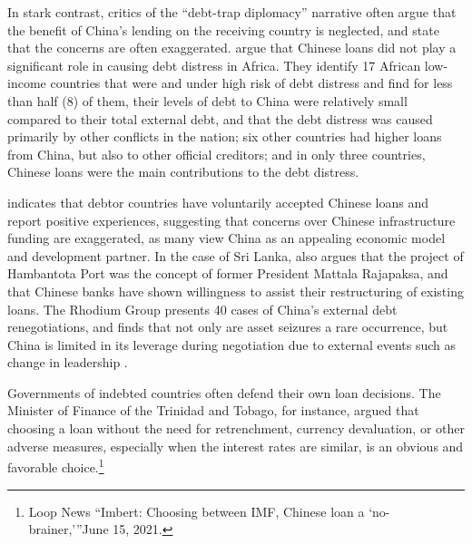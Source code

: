 In stark contrast, critics of the ``debt-trap diplomacy'' narrative often argue that the benefit of China's lending on the receiving country is neglected, and state that the concerns are often exaggerated.
\citet*{Eom-18} argue that Chinese loans did not play a significant role in causing debt distress in Africa. They identify 17 African low-income  countries that were and under high risk of debt distress and find for less than half (8) of them, their levels of debt to China were relatively small compared to their total external debt, and that the debt distress was caused primarily by other conflicts in the nation; six other countries had higher loans from China, but also to other official creditors; and in only three countries, Chinese loans were the main contributions to the debt distress.

\citet*{Brautigam-meme-2020} indicates that debtor countries have voluntarily accepted Chinese loans and report positive experiences, suggesting that concerns over Chinese infrastructure funding are exaggerated, as many view China as an appealing economic model and development partner.
In the case of Sri Lanka, \citet*{Brautigam-meme-2020} also argues that the project of Hambantota Port was the concept of former President Mattala Rajapaksa, and that Chinese banks have shown willingness to assist their restructuring of existing loans.
The Rhodium Group presents 40 cases of China's external debt renegotiations, and finds that not only are asset seizures a rare occurrence, but China is limited in its leverage during negotiation due to external events such as change in leadership \citep*{Rhodium-DTD-19}.

Governments of indebted countries often defend their own loan decisions. The Minister of Finance of the Trinidad and Tobago, for instance, argued that choosing a loan without the need for retrenchment, currency devaluation, or other adverse measures, especially when the interest rates are similar, is an obvious and favorable choice.\footnote{Loop News ``Imbert: Choosing between IMF, Chinese loan a `no-brainer,'''June 15, 2021.}

